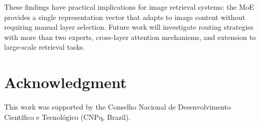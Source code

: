 \documentclass[conference]{IEEEtran}
\begin{document}
These findings have practical implications for image retrieval systems:
the MoE provides a single representation vector that adapts to image
content without requiring manual layer selection.
Future work will investigate routing strategies with more than two experts,
cross-layer attention mechanisms, and extension to large-scale retrieval
tasks.

\section*{Acknowledgment}

This work was supported by the Conselho Nacional de Desenvolvimento
Cient\'{i}fico e Tecnol\'{o}gico (CNPq, Brazil).

\end{document}

